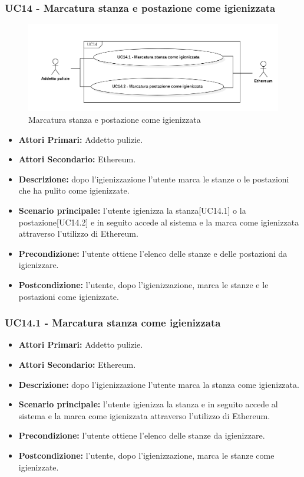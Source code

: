 \subsubsection{ UC14 - Marcatura stanza e postazione come igienizzata}
\begin{figure}[H]
		\centering
		\includegraphics[width=18cm]{res/images/UC14.png}
		\caption{Marcatura stanza e postazione come igienizzata}
		\label{fig:Marcatura stanza e postazione come igienizzata}
	\end{figure}
\begin{itemize}
           	\item\textbf{Attori Primari:} Addetto pulizie.
		\item\textbf{Attori Secondario:} Ethereum.
           	\item\textbf{Descrizione:} dopo l'igienizzazione l'utente marca le stanze o le postazioni che ha pulito come igienizzate.
           	\item\textbf{Scenario principale:} l'utente igienizza la stanza[UC14.1] o la postazione[UC14.2] e in seguito accede al sistema e la marca come igienizzata attraverso l'utilizzo di Ethereum.
           	\item\textbf{Precondizione:} l'utente ottiene l'elenco delle stanze e delle postazioni da igienizzare.
           	\item\textbf{Postcondizione:} l'utente, dopo l'igienizzazione, marca le stanze e le postazioni come igienizzate.
\end{itemize}
\subsubsection{UC14.1 - Marcatura stanza come igienizzata}
\begin{itemize}
           	\item\textbf{Attori Primari:} Addetto pulizie.
		\item\textbf{Attori Secondario:} Ethereum.
           	\item\textbf{Descrizione:} dopo l'igienizzazione l'utente marca la stanza come igienizzata.
           	\item\textbf{Scenario principale:} l'utente igienizza la stanza e in seguito accede al sistema e la marca come igienizzata attraverso l'utilizzo di Ethereum.
           	\item\textbf{Precondizione:} l'utente ottiene l'elenco delle stanze da igienizzare.
           	\item\textbf{Postcondizione:} l'utente, dopo l'igienizzazione, marca le stanze come igienizzate.
\end{itemize}
